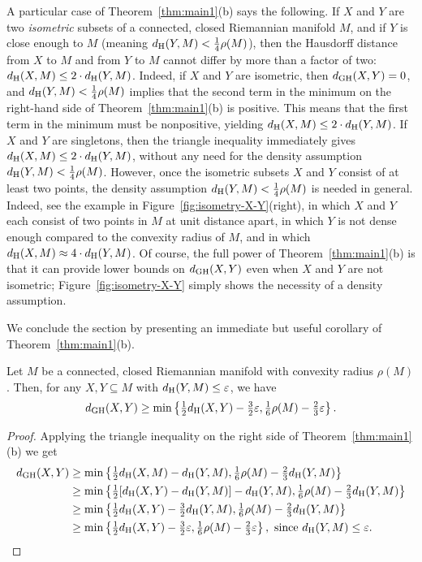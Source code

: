 \documentclass[11pt, reqno, english]{amsart}
\begin{document}
\begin{remark}
A particular case of Theorem~\ref{thm:main1}(b) says the following.
If $X$ and $Y$ are two \emph{isometric} subsets of a connected, closed Riemannian manifold $M$, and if $Y$ is close enough to $M$ (meaning $d_{\mathrm{H}}(Y,M)<\frac{1}{4}\rho(M)$), then the Hausdorff distance from $X$ to $M$ and from $Y$ to $M$ cannot differ by more than a factor of two: $d_{\mathrm{H}}(X,M)\le 2\cdot d_{\mathrm{H}}(Y,M)$.
Indeed, if $X$ and $Y$ are isometric, then $d_{\mathrm{GH}}(X,Y)=0$, and $d_{\mathrm{H}}(Y,M)<\frac{1}{4}\rho(M)$ implies that the second term in the minimum on the right-hand side of Theorem~\ref{thm:main1}(b) is positive. 
This means that the first term in the minimum must be nonpositive, yielding $d_{\mathrm{H}}(X,M)\le 2\cdot d_{\mathrm{H}}(Y,M)$.
If $X$ and $Y$ are singletons, then the triangle inequality immediately gives $d_{\mathrm{H}}(X,M)\le 2\cdot d_{\mathrm{H}}(Y,M)$, without any need for the density assumption $d_{\mathrm{H}}(Y,M)<\frac{1}{4}\rho(M)$.
However, once the isometric subsets $X$ and $Y$ consist of at least two points, the density assumption $d_{\mathrm{H}}(Y,M)<\frac{1}{4}\rho(M)$ is needed in general.
Indeed, see the example in Figure~\ref{fig:isometry-X-Y}(right), in which $X$ and $Y$ each consist of two points in $M$ at unit distance apart, in which $Y$ is not dense enough compared to the convexity radius of $M$, and in which $d_{\mathrm{H}}(X,M)\approx 4\cdot d_{\mathrm{H}}(Y,M)$.
Of course, the full power of Theorem~\ref{thm:main1}(b) is that it can provide lower bounds on $d_{\mathrm{GH}}(X,Y)$ even when $X$ and $Y$ are not isometric; Figure~\ref{fig:isometry-X-Y} simply shows the necessity of a density assumption.    
\end{remark}

We conclude the section by presenting an immediate but useful corollary of Theorem~\ref{thm:main1}(b). 

\begin{corollary}\label{cor:two-subsets-eps}
Let $M$ be a connected, closed Riemannian manifold with convexity radius $\rho(M)$.
Then, for any $X, Y\subseteq M$ with $d_{\mathrm{H}}(Y, M)\leq\varepsilon$, we have
\[d_{\mathrm{GH}}(X,Y) \ge \min\left\{\tfrac{1}{2}d_{\mathrm{H}}(X,Y)-\tfrac{3}{2}\varepsilon, \tfrac{1}{6}\rho(M)-\tfrac{2}{3}\varepsilon\right\}.
\]
\end{corollary}
\begin{proof}
Applying the triangle inequality on the right side of Theorem~\ref{thm:main1}(b) we get
\begin{align*}
d_{\mathrm{GH}}(X,Y) &\ge \min\left\{\tfrac{1}{2}d_{\mathrm{H}}(X,M)-d_{\mathrm{H}}(Y,M), \tfrac{1}{6}\rho(M)-\tfrac{2}{3}d_{\mathrm{H}}(Y,M)\right\} \\
&\ge \min\left\{\tfrac{1}{2}[d_{\mathrm{H}}(X,Y)-d_{\mathrm{H}}(Y, M)]-d_{\mathrm{H}}(Y,M), \tfrac{1}{6}\rho(M)-\tfrac{2}{3}d_{\mathrm{H}}(Y,M)\right\} \\
&\ge \min\left\{\tfrac{1}{2}d_{\mathrm{H}}(X,Y)-\tfrac{3}{2}d_{\mathrm{H}}(Y,M), \tfrac{1}{6}\rho(M)-\tfrac{2}{3}d_{\mathrm{H}}(Y,M)\right\} \\
&\ge\min\left\{\tfrac{1}{2}d_{\mathrm{H}}(X,Y)-\tfrac{3}{2}\varepsilon, \tfrac{1}{6}\rho(M)-\tfrac{2}{3}\varepsilon\right\},\text{ since }d_{\mathrm{H}}(Y, M)\leq\varepsilon.
\end{align*}
\end{proof}
\end{document}
